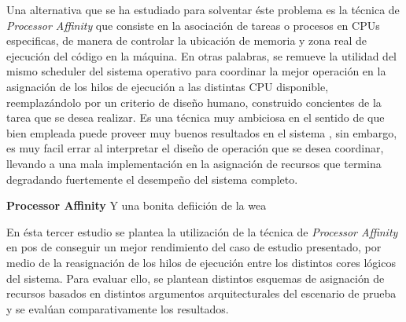 Una alternativa que se ha estudiado para solventar éste problema es la técnica de \emph{Processor Affinity} que consiste en la asociación de tareas o procesos en CPUs especificas, de manera de controlar la ubicación de memoria y zona real de ejecución del código en la máquina. En otras palabras, se remueve la utilidad del mismo scheduler del sistema operativo para coordinar la mejor operación en la asignación de los hilos de ejecución a las distintas CPU disponible, reemplazándolo por un criterio de diseño humano, construido concientes de la tarea que se desea realizar. Es una técnica muy ambiciosa en el sentido de que bien empleada puede proveer muy buenos resultados en el sistema \cite{paper:cacheaffinity}, sin embargo, es muy facil errar al interpretar el diseño de operación que se desea coordinar, llevando a una mala implementación en la asignación de recursos que termina degradando fuertemente el desempeño del sistema completo.

\begin{defn} \textbf{Processor Affinity} Y una bonita defiición de la wea
\end{defn}

En ésta tercer estudio se plantea la utilización de la técnica de \emph{Processor Affinity} en pos de conseguir un mejor rendimiento del caso de estudio presentado, por medio de la reasignación de los hilos de ejecución entre los distintos cores lógicos del sistema. Para evaluar ello, se plantean distintos esquemas de asignación de recursos basados en distintos argumentos arquitecturales del escenario de prueba y se evalúan comparativamente los resultados.


